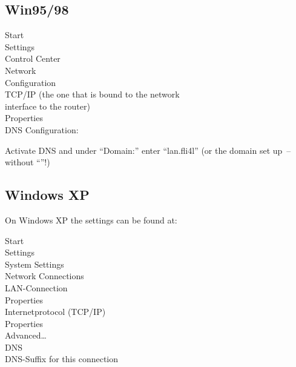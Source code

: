 \subsection{Win95/98}

  Start \pfeil\\
  \hspace*{2ex}Settings \pfeil\\
  \hspace*{4ex}Control Center \pfeil\\
  \hspace*{6ex}Network \pfeil\\
  \hspace*{8ex}Configuration \pfeil\\
  \hspace*{10ex}TCP/IP (the one that is bound to the network\\
  \hspace*{10ex}interface to the router) \pfeil\\
  \hspace*{12ex}Properties \pfeil\\
  \hspace*{14ex}DNS Configuration:

  Activate DNS and under ``Domain:'' enter ``lan.fli4l'' (or the domain
  set up~-- without ``''!)

\subsection{Windows XP}

  On Windows XP the settings can be found at:

  \noindent Start \pfeil\\
  \hspace*{2ex}Settings \pfeil\\
  \hspace*{4ex}System Settings \pfeil\\
  \hspace*{6ex}Network Connections \pfeil\\
  \hspace*{8ex}LAN-Connection\pfeil\\
  \hspace*{10ex}Properties \pfeil\\
  \hspace*{12ex}Internetprotocol (TCP/IP) \pfeil\\
  \hspace*{14ex}Properties \pfeil\\
  \hspace*{16ex}Advanced\ldots \pfeil\\
  \hspace*{18ex}DNS \pfeil\\
  \hspace*{20ex}DNS-Suffix for this connection \pfeil\\

